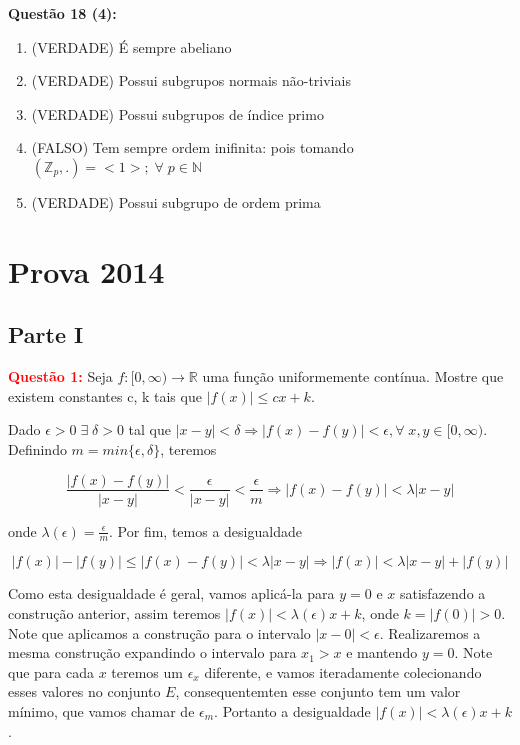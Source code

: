 \documentclass{article}
\begin{document}
\textbf{Questão 18 (4):}
\begin{enumerate}
	\item (VERDADE) É sempre abeliano
	
	\item (VERDADE) Possui subgrupos normais não-triviais 
	
	\item (VERDADE) Possui subgrupos de índice primo
	
	\item (FALSO) Tem sempre ordem inifinita: pois tomando $(\mathbb{Z}_p, .) = <1>; \; \forall \; p \in \mathbb{N}$
	
	\item (VERDADE) Possui subgrupo de ordem prima
\end{enumerate}

\section{Prova 2014}
\subsection{Parte I}
\textcolor{red}{\textbf{Questão 1:}} Seja $f: [0,\infty) \to \mathbb R$ uma
função uniformemente contínua. Mostre que existem constantes c, k tais que $|f(x)| \leq cx+k$.

Dado $\epsilon >0 \; \exists \; \delta>0$ tal que $|x-y| < \delta \Rightarrow
|f(x)-f(y)| < \epsilon, \forall \; x, y \in [0,\infty) $. Definindo $m =
min\{\epsilon, \delta\}$, teremos 

$$\frac{|f(x)-f(y)|}{|x-y|} < \frac{\epsilon}{|x-y|} < \frac{\epsilon}{m}
\Rightarrow |f(x)-f(y)| < \lambda |x-y|$$

onde $\lambda(\epsilon) = \frac{\epsilon}{m}$. Por fim, temos a
desigualdade 


$$|f(x)|-|f(y)| \leq |f(x)-f(y)| < \lambda |x-y|\Rightarrow |f(x)| <
\lambda |x-y| + |f(y)|$$

Como esta desigualdade é geral, vamos aplicá-la para $y=0$ e $x$ satisfazendo
a construção anterior, assim teremos $|f(x)| < \lambda(\epsilon) x + k$, onde
$k=|f(0)|>0$. Note que aplicamos a construção para o intervalo $|x - 0| <
\epsilon$. Realizaremos a mesma construção expandindo o intervalo para $x_1 > x$
e mantendo $y=0$. Note que para cada $x$ teremos um $\epsilon_x$ diferente, e
vamos iteradamente colecionando esses valores no conjunto $E$,
consequentemten esse conjunto tem um valor mínimo, que vamos chamar de
$\epsilon_m$. Portanto a desigualdade $|f(x)| < \lambda(\epsilon) x +
k$.
\end{document}
